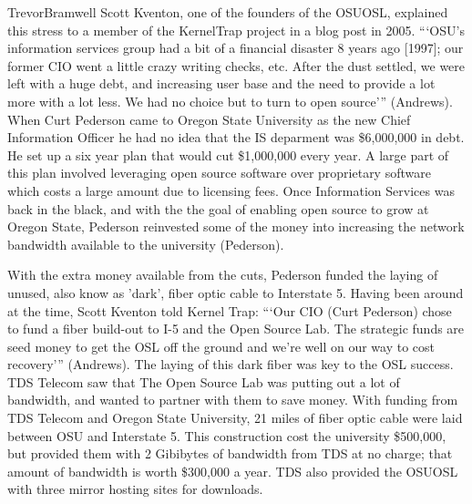 \documentclass[12pt,letterpaper]{article}
\begin{document}
\begin{mla}{Trevor}{Bramwell}
Scott Kventon, one of the founders of the OSUOSL, explained this stress to a
member of the KernelTrap project in a blog post in 2005. ```OSU's information
services group had a bit of a financial disaster 8 years
ago [1997]; our former CIO went a little crazy writing checks, etc. After the 
dust settled, we were left with a huge debt, and increasing user base and the 
need to provide a lot more with a lot less. We had no choice but to turn to 
open source''' (Andrews).
When Curt Pederson came to Oregon State University as the new Chief Information
Officer he had no idea that the IS deparment was \$6,000,000
in debt. He set up a six year plan that would cut \$1,000,000 every year. A
large part of this plan involved leveraging open source software over
proprietary software which costs a large amount due to licensing fees.
Once Information Services was back in the black, and with the the goal of
enabling open source to grow at Oregon State, Pederson reinvested
some of the money into increasing the network bandwidth available to the 
university (Pederson).

With the extra money available from the cuts, Pederson funded the laying
of unused, also know as 'dark', fiber optic cable to Interstate 5.
Having been around at the time, Scott Kventon told Kernel Trap: ```Our CIO 
(Curt Pederson) chose to fund a fiber build-out to I-5 and the Open
Source Lab. The strategic funds are seed money to get the OSL off the ground
and we're well on our way to cost recovery''' (Andrews).
The laying of this dark fiber was key to the OSL success. TDS Telecom saw that
The Open Source Lab was putting out a lot of bandwidth, and wanted to partner
with them to save money. With funding from TDS Telecom and Oregon State 
University, 21 miles of fiber optic cable
were laid between OSU and Interstate 5. This construction cost the university
\$500,000, but provided them with 2 Gibibytes of bandwidth from TDS at no 
charge; that amount of bandwidth is worth \$300,000 a year. 
TDS also provided the OSUOSL with three mirror hosting sites for downloads.


\end{mla}
\end{document}
